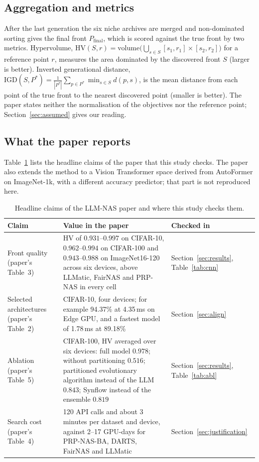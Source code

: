 \documentclass[pdflatex,sn-mathphys-num]{sn-jnl}
\newcommand{\HV}{\mathrm{HV}}
\newcommand{\IGD}{\mathrm{IGD}}
\begin{document}
\subsection{Aggregation and metrics}
After the last generation the six niche archives are merged and non-dominated sorting gives the final front $P_{\mathrm{final}}$, which is scored against the true front by two metrics. Hypervolume, $\HV(S,r)=\mathrm{volume}\big(\bigcup_{s\in S}[s_1,r_1]\times[s_2,r_2]\big)$ for a reference point $r$, measures the area dominated by the discovered front $S$ (larger is better). Inverted generational distance, $\IGD(S,P^\ast)=\frac{1}{|P^\ast|}\sum_{p\in P^\ast}\min_{s\in S}d(p,s)$, is the mean distance from each point of the true front to the nearest discovered point (smaller is better). The paper states neither the normalisation of the objectives nor the reference point; Section~\ref{sec:assumed} gives our reading.

\subsection{What the paper reports}
Table~\ref{tab:claims} lists the headline claims of the paper that this study checks. The paper also extends the method to a Vision Transformer space derived from AutoFormer on ImageNet-1k, with a different accuracy predictor; that part is not reproduced here.

\begin{table}[h]\centering\footnotesize\setlength{\tabcolsep}{3pt}
\caption{Headline claims of the LLM-NAS paper and where this study checks them.}\label{tab:claims}
\begin{tabular}{p{2.7cm}p{6.4cm}p{2.3cm}}
\toprule
Claim & Value in the paper & Checked in \\
\midrule
Front quality (paper's Table~3) & HV of $0.931$--$0.997$ on CIFAR-10, $0.962$--$0.994$ on CIFAR-100 and $0.943$--$0.988$ on ImageNet16-120 across six devices, above LLMatic, FairNAS and PRP-NAS in every cell & Section~\ref{sec:results}, Table~\ref{tab:cnn} \\
Selected architectures (paper's Table~2) & CIFAR-10, four devices; for example 94.37\% at 4.35\,ms on Edge GPU, and a fastest model of 1.78\,ms at 89.18\% & Section~\ref{sec:align} \\
Ablation (paper's Table~5) & CIFAR-100, HV averaged over six devices: full model $0.978$; without partitioning $0.516$; partitioned evolutionary algorithm instead of the LLM $0.843$; Synflow instead of the ensemble $0.819$ & Section~\ref{sec:results}, Table~\ref{tab:abl} \\
Search cost (paper's Table~4) & 120 API calls and about 3 minutes per dataset and device, against 2--17 GPU-days for PRP-NAS-BA, DARTS, FairNAS and LLMatic & Section~\ref{sec:justification} \\
\bottomrule
\end{tabular}
\end{table}
\end{document}
